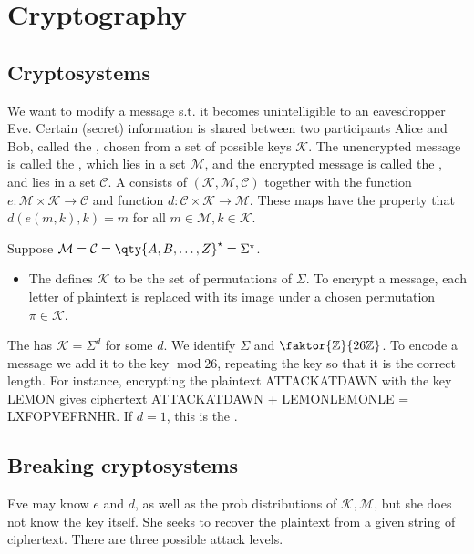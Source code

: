 \section{Cryptography}

\subsection{Cryptosystems}
We want to modify a message s.t. it becomes unintelligible to an eavesdropper Eve.
Certain (secret) information is shared between two participants Alice and Bob, called the , chosen from a set of possible keys $\mathcal K$.
The unencrypted message is called the , which lies in a set $\mathcal M$, and the encrypted message is called the , and lies in a set $\mathcal C$.
A  consists of $(\mathcal K, \mathcal M, \mathcal C)$ together with the  function $e \colon \mathcal M \times \mathcal K \to \mathcal C$ and  function $d \colon \mathcal C \times \mathcal K \to \mathcal M$.
These maps have the property that $d(e(m, k), k) = m$ for all $m \in \mathcal M, k \in \mathcal K$.

\begin{example}
    Suppose $\mathcal M = \mathcal C = \qty{A, B, \dots, Z}^\star = \Sigma^\star$.
    \begin{itemize}
        \item The  defines $\mathcal K$ to be the set of permutations of $\Sigma$.
        To encrypt a message, each letter of plaintext is replaced with its image under a chosen permutation $\pi \in \mathcal K$.
    \end{itemize}


    The  has $\mathcal K = \Sigma^d$ for some $d$.
    We identify $\Sigma$ and $\faktor{\mathbb Z}{26\mathbb Z}$.
    To encode a message we add it to the key $\operatorname{mod} 26$, repeating the key so that it is the correct length.
    For instance, encrypting the plaintext ATTACKATDAWN with the key LEMON gives ciphertext ATTACKATDAWN + LEMONLEMONLE = LXFOPVEFRNHR.
    If $d = 1$, this is the .
\end{example}

\subsection{Breaking cryptosystems}
Eve may know $e$ and $d$, as well as the prob distributions of $\mathcal K, \mathcal M$, but she does not know the key itself.
She seeks to recover the plaintext from a given string of ciphertext.
There are three possible attack levels.

